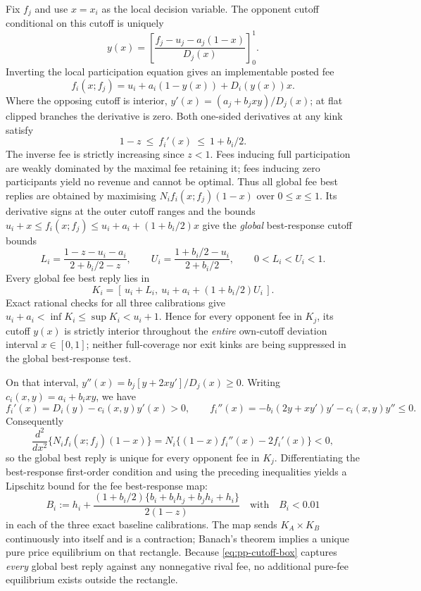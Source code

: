 \documentclass[11pt]{article}
\begin{document}
Fix $f_j$ and use $x=x_i$ as the local decision variable. The opponent cutoff conditional on this cutoff is uniquely
\[
 y(x)=\left[\frac{f_j-u_j-a_j(1-x)}{D_j(x)}\right]_0^1 .
\]
Inverting the local participation equation gives an implementable posted fee
\[
 f_i(x;f_j)=u_i+a_i(1-y(x))+D_i(y(x))x .
\]
Where the opposing cutoff is interior, $y'(x)=(a_j+b_jxy)/D_j(x)$; at flat clipped branches the derivative is zero. Both one-sided derivatives at any kink satisfy
\begin{equation}
 1-z\ \leq\ f_i'(x)\ \leq\ 1+b_i/2 .\label{eq:pp-monotone-inverse}
\end{equation}
The inverse fee is strictly increasing since $z<1$. Fees inducing full participation are weakly dominated by the maximal fee retaining it; fees inducing zero participants yield no revenue and cannot be optimal. Thus all global fee best replies are obtained by maximising $N_i f_i(x;f_j)(1-x)$ over $0\leq x\leq1$. Its derivative signs at the outer cutoff ranges and the bounds
$u_i+x\leq f_i(x;f_j)\leq u_i+a_i+(1+b_i/2)x$
give the \emph{global} best-response cutoff bounds
\begin{equation}
 L_i=\frac{1-z-u_i-a_i}{2+b_i/2-z},\qquad
 U_i=\frac{1+b_i/2-u_i}{2+b_i/2},\qquad
 0<L_i<U_i<1 .
 \label{eq:pp-cutoff-box}
\end{equation}
Every global fee best reply lies in
\[
 K_i=[\,u_i+L_i,\ u_i+a_i+(1+b_i/2)U_i\,].
\]
Exact rational checks for all three calibrations give
$u_i+a_i<\inf K_i\leq\sup K_i<u_i+1$.
Hence for every opponent fee in $K_j$, its cutoff $y(x)$ is strictly interior throughout the \emph{entire} own-cutoff deviation interval $x\in[0,1]$; neither full-coverage nor exit kinks are being suppressed in the global best-response test.

On that interval, $y''(x)=b_j[y+2xy']/D_j(x)\geq0$. Writing $c_i(x,y)=a_i+b_i xy$, we have
\[
 f_i'(x)=D_i(y)-c_i(x,y)y'(x)>0,\qquad
 f_i''(x)=-b_i(2y+xy')y'-c_i(x,y)y''\leq0.
\]
Consequently
\[
 \frac{d^2}{dx^2}\{N_if_i(x;f_j)(1-x)\}
 =N_i\{(1-x)f_i''(x)-2f_i'(x)\}<0,
\]
so the global best reply is unique for every opponent fee in $K_j$. Differentiating the best-response first-order condition and using the preceding inequalities yields a Lipschitz bound for the fee best-response map:
\begin{equation}
 B_i:=h_i+\frac{(1+b_i/2)\{b_i+b_ih_j+b_jh_i+h_i\}}{2(1-z)}
 \quad\text{with}\quad B_i<0.01
 \label{eq:pp-br-contraction}
\end{equation}
in each of the three exact baseline calibrations. The map sends $K_A\times K_B$ continuously into itself and is a contraction; Banach's theorem implies a unique pure price equilibrium on that rectangle. Because \eqref{eq:pp-cutoff-box} captures \emph{every} global best reply against any nonnegative rival fee, no additional pure-fee equilibrium exists outside the rectangle.
\end{document}
